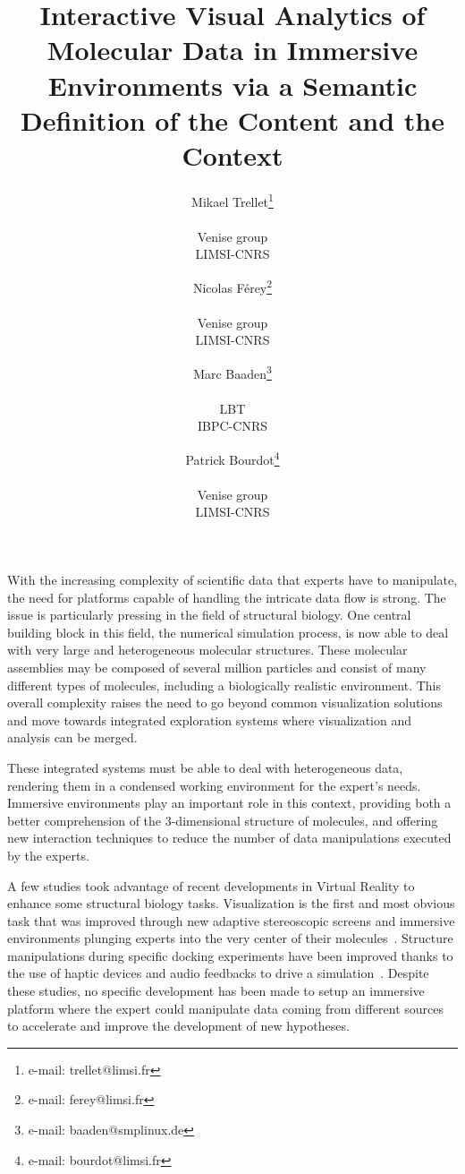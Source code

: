 \documentclass{vgtc}                          %
\title{Interactive Visual Analytics of Molecular Data in Immersive Environments via a Semantic Definition of the Content and the Context}
\author{Mikael Trellet\thanks{e-mail: trellet@limsi.fr}\\ %
      \parbox{1.4in}{\scriptsize \centering Venise group \\ LIMSI-CNRS }%
\and Nicolas F\'{e}rey\thanks{e-mail: ferey@limsi.fr}\\ %
     \parbox{1.4in}{\scriptsize \centering Venise group \\ LIMSI-CNRS }%
\and Marc Baaden\thanks{e-mail: baaden@smplinux.de}\\ %
     \parbox{1.4in}{\scriptsize \centering LBT \\ IBPC-CNRS}
\and Patrick Bourdot\thanks{e-mail: bourdot@limsi.fr}\\ %
     \parbox{1.4in}{\scriptsize \centering Venise group \\ LIMSI-CNRS }}%
\begin{document}


\maketitle



With the increasing complexity of scientific data that experts have to manipulate, the need for platforms capable of handling the intricate data flow is strong. The issue is particularly pressing in the field of structural biology. One central building block in this field, the numerical simulation process, is now able to deal with very large and heterogeneous molecular structures. These molecular assemblies may be composed of several million particles and consist of many different types of molecules, including a biologically realistic environment. This overall complexity raises the need to go beyond common visualization solutions and move towards integrated exploration systems where visualization and analysis can be merged. 

These integrated systems must be able to deal with heterogeneous data, rendering them in a condensed working environment for the expert's needs.
Immersive environments play an important role in this context, providing both a better comprehension of the 3-dimensional structure of molecules, and offering new interaction techniques to reduce the number of data manipulations executed by the experts.

A few studies took advantage of recent developments in Virtual Reality to enhance some structural biology tasks. Visualization is the first and most obvious task that was improved through new adaptive stereoscopic screens and immersive environments plunging experts into the very center of their molecules~\cite{van2000immersive,stone_immersive_2010,odonoghue_visualization_2010,hirst2014molecular}. Structure manipulations during specific docking experiments have been improved thanks to the use of haptic devices and audio feedbacks to drive a simulation~\cite{ferey_multisensory_2009}. Despite these studies, no specific development has been made to setup an immersive platform where the expert could manipulate data coming from different sources to accelerate and improve the development of new hypotheses.
\end{document}

